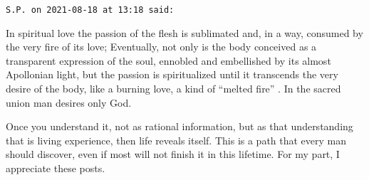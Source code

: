\begin{footnotesize}
\begin{sffamily}
\texttt{S.P. on 2021-08-18 at 13:18 said:}

In spiritual love the passion of the flesh is sublimated and, in a way, consumed by the very fire of its love; Eventually, not only is the body conceived as a transparent expression of the soul, ennobled and embellished by its almost Apollonian light, but the passion is spiritualized until it transcends the very desire of the body, like a burning love, a kind of ``melted fire'' . In the sacred union man desires only God.

Once you understand it, not as rational information, but as that understanding that is living experience, then life reveals itself. This is a path that every man should discover, even if most will not finish it in this lifetime. For my part, I appreciate these posts.


\hfill

\end{sffamily}
\end{footnotesize}

